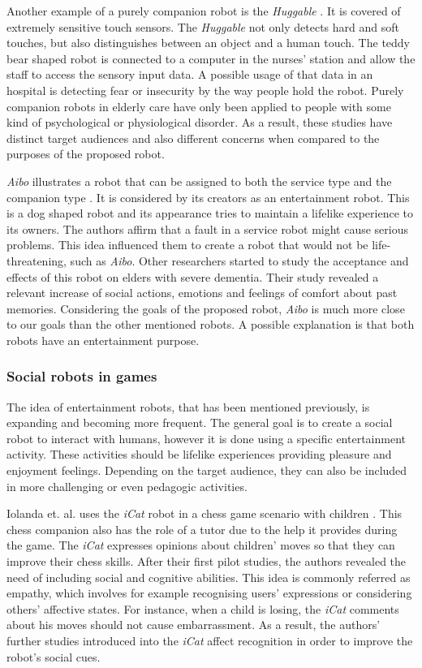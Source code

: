 Another example of a purely companion robot is the \emph{Huggable} \cite{Stiehl2005}.
It is covered of extremely sensitive touch sensors.
The \emph{Huggable} not only detects hard and soft touches, but also distinguishes between an object and a human touch.
The teddy bear shaped robot is connected to a computer in the nurses' station and allow the staff to access the sensory input data.
A possible usage of that data in an hospital is detecting fear or insecurity by the way people hold the robot.
Purely companion robots in elderly care have only been applied to people with some kind of psychological or physiological disorder.
As a result, these studies have distinct target audiences and also different concerns when compared to the purposes of the proposed robot.


\emph{Aibo} illustrates a robot that can be assigned to both the service type and the companion type \cite{Fujita1983}.
It is considered by its creators as an entertainment robot.
This is a dog shaped robot and its appearance tries to maintain a lifelike experience to its owners.
The authors affirm that a fault in a service robot might cause serious problems.
This idea influenced them to create a robot that would not be life-threatening, such as \emph{Aibo}.
Other researchers started to study the acceptance and effects of this robot on elders with severe dementia.
Their study revealed a relevant increase of social actions, emotions and feelings of comfort about past memories.
Considering the goals of the proposed robot, \emph{Aibo} is much more close to our goals than the other mentioned robots.
A possible explanation is that both robots have an entertainment purpose.



\subsubsection{Social robots in games}

The idea of entertainment robots, that has been mentioned previously, is expanding and becoming more frequent.
The general goal is to create a social robot to interact with humans, however it is done using a specific entertainment activity.
These activities should be lifelike experiences providing pleasure and enjoyment feelings.
Depending on the target audience, they can also be included in more challenging or even pedagogic activities.

Iolanda et. al. uses the \emph{iCat} robot in a chess game scenario with children \cite{Leitea}\cite{Castellano2010}\cite{Leite}.
This chess companion also has the role of a tutor due to the help it provides during the game.
The \emph{iCat} expresses opinions about children' moves so that they can improve their chess skills.
After their first pilot studies, the authors revealed the need of including social and cognitive abilities.
This idea is commonly referred as empathy, which involves for example recognising users' expressions or considering others' affective states.
For instance, when a child is losing, the \emph{iCat} comments about his moves should not cause embarrassment.
As a result, the authors' further studies introduced into the \emph{iCat} affect recognition in order to improve the robot's social cues.

